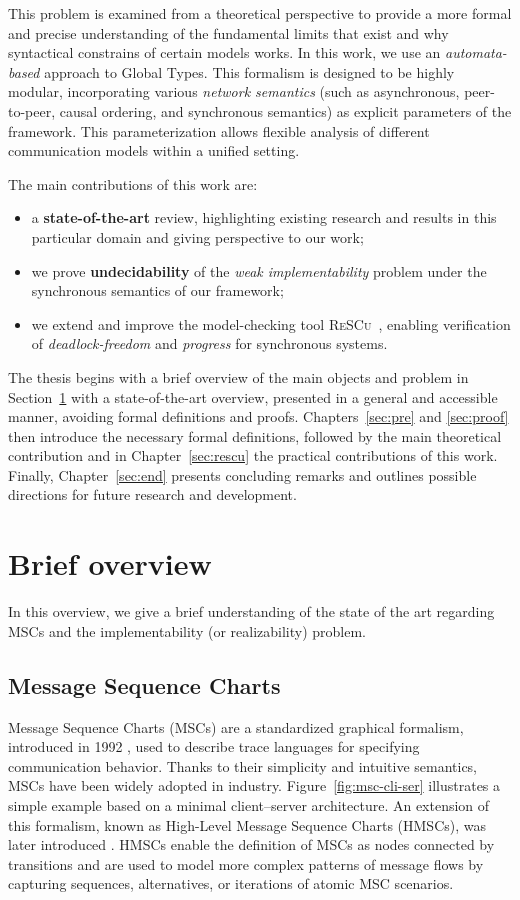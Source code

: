 This problem is examined from a theoretical
perspective to provide a more formal and precise understanding of
the fundamental limits that exist and why syntactical constrains
of certain models works.
In this work, we use an \textit{automata-based} approach to Global Types. 
This formalism is designed to be highly modular, 
incorporating various \textit{network semantics} (such as asynchronous, 
peer-to-peer, causal ordering, and synchronous semantics) as explicit 
parameters of the framework. This parameterization allows flexible 
analysis of different communication models within a unified setting.

The main contributions of this work are: 
\begin{itemize}
    \item a \textbf{state-of-the-art} review, highlighting
    existing research and results in this particular domain and giving
    perspective to our work;
    \item we prove \textbf{undecidability} of the \textit{weak implementability} 
    problem under the synchronous semantics of our framework;
    \item we extend and improve the model-checking tool \textsc{ReSCu}~\cite{rescurepo},  
    enabling verification of \textit{deadlock-freedom} and \textit{progress} 
    for synchronous systems.
\end{itemize}
The thesis begins with a brief overview of the main objects and problem
in Section~\ref{sec:sota} with a state-of-the-art
overview, presented in a general and accessible manner, avoiding
formal definitions and proofs. Chapters~\ref{sec:pre} and
\ref{sec:proof} then introduce the necessary formal definitions,
followed by the main theoretical contribution and in 
Chapter~\ref{sec:rescu} the practical contributions of
this work. Finally, Chapter~\ref{sec:end} presents concluding
remarks and outlines possible directions for future research and
development.

\section{Brief overview}\label{sec:sota}
In this overview, we give a brief understanding of the
state of the art regarding MSCs and the implementability 
(or realizability) problem.

\subsection{Message Sequence Charts}
Message Sequence Charts (MSCs) are a standardized graphical formalism,
introduced in 1992 \cite{MSCStandard}, used to describe trace languages for specifying
communication behavior. Thanks to their simplicity and intuitive
semantics, MSCs have been widely adopted in industry.
Figure~\ref{fig:msc-cli-ser} illustrates a simple example based on a
minimal client–server architecture. An extension of this formalism,
known as High-Level Message Sequence Charts (HMSCs), was later
introduced \cite{HMSCStandard}. HMSCs enable the definition of
MSCs as nodes connected by transitions and are used to model more
complex patterns of message flows by capturing sequences, alternatives,
or iterations of atomic MSC scenarios.


